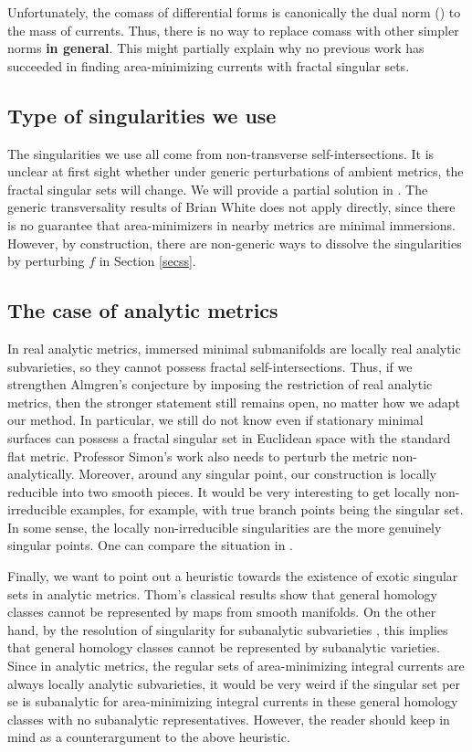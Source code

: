 \documentclass[11pt,a4paper]{amsart}
\numberwithin{equation}{section}
\theoremstyle{plain}
\theoremstyle{definition}
\numberwithin{equation}{subsection}
\begin{document}
Unfortunately, the comass of differential forms is canonically the dual norm (\cite{HFrf}) to the mass of currents. Thus, there is no way to replace comass with other simpler norms \textbf{in general}. This might partially explain why no previous work has succeeded in finding area-minimizing currents with fractal singular sets.
\subsection{Type of singularities we use}
	The singularities we use all come from non-transverse self-intersections. It is unclear at first sight whether under generic perturbations of ambient metrics, the fractal singular sets will change. We will provide a partial solution in \cite{ZLa2}. The generic transversality results of Brian White \cite{BWgt,MR1305283} does not apply directly, since there is no guarantee that area-minimizers in nearby metrics are minimal immersions. However, by construction, there are non-generic ways to dissolve the singularities by perturbing $f$ in Section \ref{secss}.
\subsection{The case of analytic metrics}
	In real analytic metrics, immersed minimal submanifolds are locally real analytic subvarieties, so they cannot possess fractal self-intersections. Thus, if we strengthen Almgren's conjecture \cite[ Problem 5.4]{GMT} by imposing the restriction of real analytic metrics, then the stronger statement still remains open, no matter how we adapt our method. In particular, we still do not know even if stationary minimal surfaces can possess a fractal singular set in Euclidean space with the standard flat metric. Professor Simon's work \cite{LSfr} also needs to perturb the metric  non-analytically. Moreover, around any singular point, our construction is locally reducible into two smooth pieces. It would be very interesting to get locally non-irreducible examples, for example, with true branch points being the singular set. In some sense, the locally non-irreducible singularities are the more genuinely singular points. One can compare the situation in \cite[Theorem 1.8 and Conjecture 1.7 ]{DPHM}.

Finally, we want to point out a heuristic towards the existence of exotic singular sets in analytic metrics. Thom's classical results \cite{RT} show that general homology classes cannot be represented by maps from smooth manifolds. On the other hand, by the resolution of singularity for subanalytic subvarieties \cite{BM}, this implies that general homology classes cannot be represented by subanalytic varieties. Since in analytic metrics, the regular sets of area-minimizing integral currents are always locally analytic subvarieties, it would be very weird if the singular set per se is subanalytic for area-minimizing integral currents in these general homology classes with no subanalytic representatives. However, the reader should keep \cite{SA} in mind as a counterargument to the above heuristic.
\end{document}
